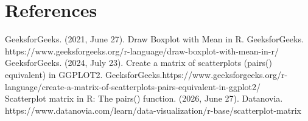 \documentclass[12pt,letterpaper]{article}
\begin{document}
\newpage

	\section*{References}
	
\noindent GeeksforGeeks. (2021, June 27). Draw Boxplot with Mean in R. GeeksforGeeks. \\
\noindent https://www.geeksforgeeks.org/r-language/draw-boxplot-with-mean-in-r/ \\

\noindent GeeksforGeeks. (2024, July 23). Create a matrix of scatterplots (pairs() equivalent) in GGPLOT2. 
GeeksforGeeks.https://www.geeksforgeeks.org/r-language/create-a-matrix-of-scatterplots-pairs-equivalent-in-ggplot2/ \\

\noindent Scatterplot matrix in R: The pairs() function. (2026, June 27). Datanovia.\\ 
\noindent https://www.datanovia.com/learn/data-visualization/r-base/scatterplot-matrix \\
\end{document}
